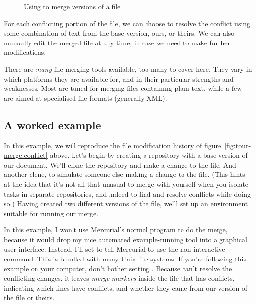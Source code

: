 \begin{figure}[ht]
  \centering
  \caption{Using  to merge versions of a file}
  \label{fig:tour-merge:kdiff3}
\end{figure}

For each conflicting portion of the file, we can choose to resolve
the conflict using some combination of text from the base version,
ours, or theirs.  We can also manually edit the merged file at any
time, in case we need to make further modifications.

There are \emph{many} file merging tools available, too many to cover
here.  They vary in which platforms they are available for, and in
their particular strengths and weaknesses.  Most are tuned for merging
files containing plain text, while a few are aimed at specialised file
formats (generally XML).

\subsection{A worked example}

In this example, we will reproduce the file modification history of
figure~\ref{fig:tour-merge:conflict} above.  Let's begin by creating a
repository with a base version of our document.
We'll clone the repository and make a change to the file.
And another clone, to simulate someone else making a change to the
file.  (This hints at the idea that it's not all that unusual to merge
with yourself when you isolate tasks in separate repositories, and
indeed to find and resolve conflicts while doing so.)
Having created two different versions of the file, we'll set up an
environment suitable for running our merge.

In this example, I won't use Mercurial's normal 
program to do the merge, because it would drop my nice automated
example-running tool into a graphical user interface.  Instead, I'll
set  to tell Mercurial to use the non-interactive
 command.  This is bundled with many Unix-like systems.
If you're following this example on your computer, don't bother
setting .
Because  can't resolve the conflicting changes, it
leaves \emph{merge markers} inside the file that has conflicts,
indicating which lines have conflicts, and whether they came from our
version of the file or theirs.

